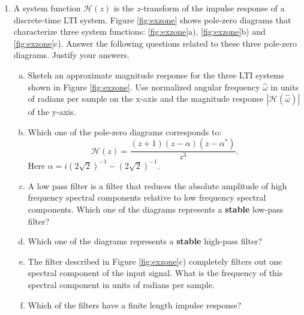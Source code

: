 \begin{enumerate}
    \item A system function $\mathcal{H}(z)$ is the $z$-transform of the impulse response of a discrete-time
          LTI system. Figure \ref{fig:exzone} shows pole-zero diagrams that characterize three
          system functions: \ref{fig:exzone}a), \ref{fig:exzone}b) and \ref{fig:exzone}c).
          Answer the following questions related to these three pole-zero diagrams. Justify your answers.

          \begin{enumerate}[a)]

              \item Sketch an approximate magnitude response for the three LTI systems shown
                    in Figure \ref{fig:exzone}. Use normalized angular frequency $\hat{\omega}$
                    in units of radians per sample on the x-axis and the magnitude
                    response $|\mathcal{H}(\hat{\omega})|$ of the y-axis.

              \item  Which one of the pole-zero diagrams corresponds to:
                    \begin{equation}
                        \mathcal{H}(z) = \frac{(z+1)(z-\alpha)(z-\alpha^*)}{z^3}.
                    \end{equation}
                    Here $\alpha=i (2\sqrt{2})^{-1} - (2\sqrt{2})^{-1}$.

              \item A low pass filter is a filter that reduces the absolute
                    amplitude of high frequency spectral components relative to low
                    frequency spectral components. Which one of the diagrams represents
                    a \textbf{stable} low-pass filter?

              \item Which one of the diagrams represents a \textbf{stable} high-pass filter?

              \item The filter described in Figure \ref{fig:exzone}c) completely filters out one spectral component
                    of the input signal. What is the frequency of this spectral
                    component in units of radians per sample.

              \item Which of the filters have a finite length impulse response?
          \end{enumerate}
\end{enumerate}